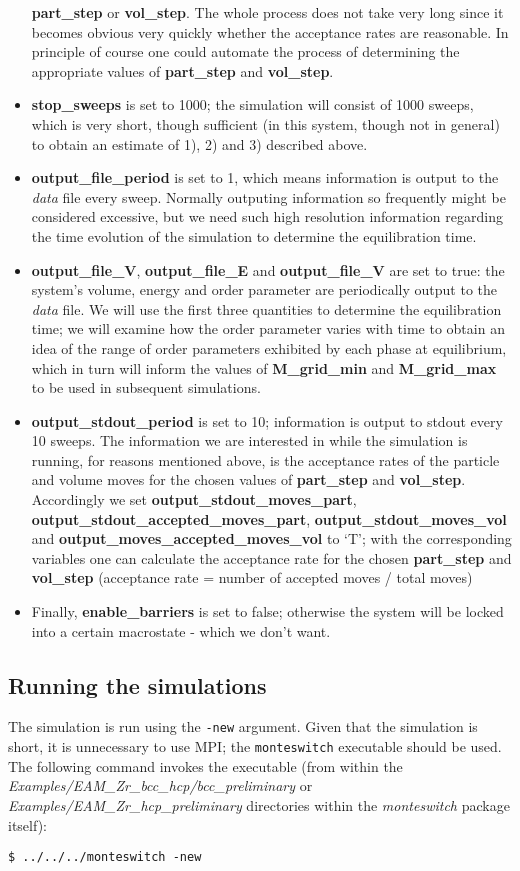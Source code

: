 \documentclass{report}
\begin{document}
\begin{itemize}
  \textbf{part\_step} or \textbf{vol\_step}. The whole process does not take very long since it becomes obvious very quickly whether the acceptance
  rates are reasonable. In principle of course one could automate the process of determining the appropriate values of \textbf{part\_step}
  and \textbf{vol\_step}.
\item \textbf{stop\_sweeps} is set to 1000; the simulation will consist of 1000 sweeps, which is very short, though sufficient (in this system, though
  not in general) to obtain an estimate of 1), 2) and 3) described above. 
\item \textbf{output\_file\_period} is set to 1, which means information is output to the \emph{data} file every sweep. Normally outputing information
  so frequently might be considered excessive, but we need such high resolution information regarding the time evolution of the simulation to 
  determine the equilibration time.
\item \textbf{output\_file\_V}, \textbf{output\_file\_E} and \textbf{output\_file\_V} are set to true: the system's volume, energy and order parameter 
  are periodically output 
  to the \emph{data} file. We will use the first three quantities to determine the equilibration time; we will examine how the order parameter
  varies with time to obtain an idea of the range of order parameters exhibited by each phase at equilibrium, which in turn will inform the
  values of \textbf{M\_grid\_min} and \textbf{M\_grid\_max} to be used in subsequent simulations.
\item \textbf{output\_stdout\_period} is set to 10; information is output to stdout every 10 sweeps. The information we are interested in while the simulation
  is running, for reasons mentioned above, is the acceptance rates of the particle and volume moves for the chosen values of \textbf{part\_step} and 
  \textbf{vol\_step}.
  Accordingly we set \textbf{output\_stdout\_moves\_part}, \textbf{output\_stdout\_accepted\_moves\_part}, \textbf{output\_stdout\_moves\_vol} and 
  \textbf{output\_moves\_accepted\_moves\_vol} to `T'; with the corresponding variables one can calculate the acceptance rate for the chosen
  \textbf{part\_step} and \textbf{vol\_step} (acceptance rate = number of
  accepted moves / total moves)
\item Finally, \textbf{enable\_barriers} is set to false; otherwise the system will be locked into a certain macrostate - which we don't want.
\end{itemize}


\subsection{Running the simulations}
The simulation is run using the \texttt{-new} argument. Given that the simulation is short, it is unnecessary to use MPI; the \texttt{monteswitch} executable
should be used. The following command invokes the executable (from within the \emph{Examples/EAM\_Zr\_bcc\_hcp/bcc\_preliminary} or 
\emph{Examples/EAM\_Zr\_hcp\_preliminary} directories within the \emph{monteswitch} package itself):
\begin{verbatim}
$ ../../../monteswitch -new
\end{verbatim}
\end{document}
